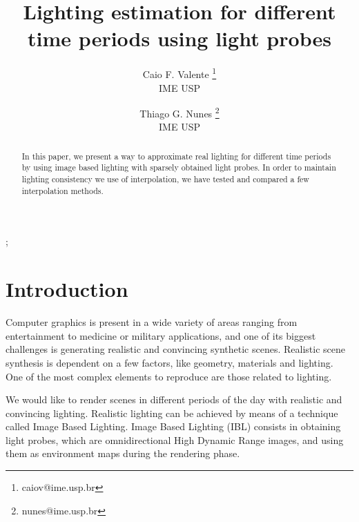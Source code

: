\documentclass[conference]{acmsiggraph}
\title{Lighting estimation for different time periods using light probes}
\author{
  Caio F. Valente
  \thanks{caiov@ime.usp.br} \\
  IME USP
  \and
  Thiago G. Nunes
  \thanks{nunes@ime.usp.br} \\
  IME USP
}
\begin{document}

\maketitle

\begin{abstract}
	In this paper, we present a way to approximate real lighting for different time periods by using image based lighting with sparsely obtained light probes. In order to maintain 
	lighting consistency we use of interpolation, we have tested and compared a few interpolation methods.
\end{abstract}

\begin{CRcatlist}
  ;
\end{CRcatlist}

\keywordlist


\TOGlinkslist


\copyrightspace

\section{Introduction}

Computer graphics is present in a wide variety of areas ranging from entertainment to medicine or military applications, and one of its biggest challenges is generating realistic and 
convincing synthetic scenes. Realistic scene synthesis is dependent on a few factors, like geometry, materials and lighting. One of the most complex elements to reproduce are those 
related to lighting.

We would like to render scenes in different periods of the day with realistic and convincing lighting. Realistic lighting can be achieved by means of a technique called Image 
Based Lighting. Image Based Lighting (IBL) consists in obtaining light probes, which are omnidirectional High Dynamic Range images, and using them as environment maps during the rendering phase.
\end{document}
